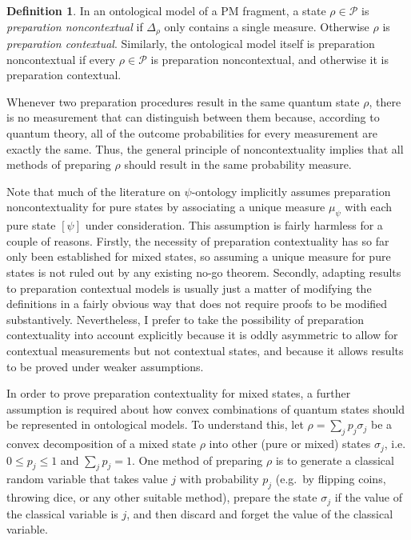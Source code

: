 \documentclass[DIV=calc,paper=a4,fontsize=11pt,twocolumn]{scrartcl} %
\theoremstyle{definition}
\newtheorem{definition}{Definition}[section]
\theoremstyle{plain}
\newcommand{\Proj}[1]{\ensuremath{\left [ #1 \right ]}}
\begin{document}
\begin{definition}
In an ontological model of a PM fragment, a state $\rho \in
\mathcal{P}$ is \emph{preparation noncontextual} if $\Delta_{\rho}$
only contains a single measure.  Otherwise $\rho$ is
\emph{preparation contextual}.  Similarly, the ontological model
itself is preparation noncontextual if every $\rho \in \mathcal{P}$
is preparation noncontextual, and otherwise it is preparation
contextual.
\end{definition}

Whenever two preparation procedures result in the same quantum state
$\rho$, there is no measurement that can distinguish between them
because, according to quantum theory, all of the outcome probabilities
for every measurement are exactly the same.  Thus, the general
principle of noncontextuality implies that all methods of preparing
$\rho$ should result in the same probability measure.

Note that much of the literature on $\psi$-ontology implicitly assumes
preparation noncontextuality for pure states by associating a unique
measure $\mu_{\psi}$ with each pure state $\Proj{\psi}$ under
consideration.  This assumption is fairly harmless for a couple of
reasons.  Firstly, the necessity of preparation contextuality has so
far only been established for mixed states, so assuming a unique
measure for pure states is not ruled out by any existing no-go
theorem.  Secondly, adapting results to preparation contextual models
is usually just a matter of modifying the definitions in a fairly
obvious way that does not require proofs to be modified substantively.
Nevertheless, I prefer to take the possibility of preparation
contextuality into account explicitly because it is oddly asymmetric
to allow for contextual measurements but not contextual states, and
because it allows results to be proved under weaker assumptions.

In order to prove preparation contextuality for mixed states, a
further assumption is required about how convex combinations of
quantum states should be represented in ontological models.  To
understand this, let $\rho = \sum_j p_j \sigma_j$ be a convex
decomposition of a mixed state $\rho$ into other (pure or mixed)
states $\sigma_j$, i.e. $0 \leq p_j \leq 1$ and $\sum_j p_j = 1$.  One
method of preparing $\rho$ is to generate a classical random variable
that takes value $j$ with probability $p_j$ (e.g.\ by flipping coins,
throwing dice, or any other suitable method), prepare the state
$\sigma_j$ if the value of the classical variable is $j$, and then
discard and forget the value of the classical variable.
\end{document}
